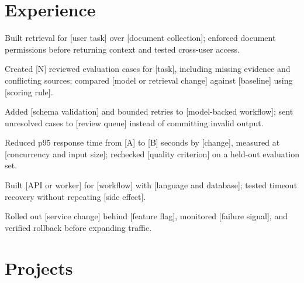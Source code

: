 \documentclass{resume}
\begin{document}

\section{Experience}

\begin{jobduties}
  \item Built retrieval for [user task] over [document collection]; enforced document permissions before returning context and tested cross-user access.
  \item Created [N] reviewed evaluation cases for [task], including missing evidence and conflicting sources; compared [model or retrieval change] against [baseline] using [scoring rule].
  \item Added [schema validation] and bounded retries to [model-backed workflow]; sent unresolved cases to [review queue] instead of committing invalid output.
  \item Reduced p95 response time from [A] to [B] seconds by [change], measured at [concurrency and input size]; rechecked [quality criterion] on a held-out evaluation set.
\end{jobduties}

\begin{jobduties}
  \item Built [API or worker] for [workflow] with [language and database]; tested timeout recovery without repeating [side effect].
  \item Rolled out [service change] behind [feature flag], monitored [failure signal], and verified rollback before expanding traffic.
\end{jobduties}

\section{Projects}
\end{document}

